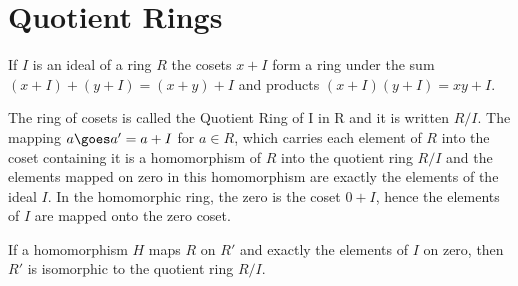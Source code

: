 \section{Quotient Rings }
\begin{theorem}
If $I$ is an ideal of a ring $R$ the cosets $x + I$ form a ring under the sum $ (x + I) + (y + I) = (x+y) + I$ and products
$(x + I ) (y + I) = xy + I$.
\end{theorem}

The ring of cosets is called the {\twelveit Quotient Ring of I in R} and it is written $R/I$.  The mapping $a \goes a' = a + I$ for $a \in R$, which carries each element of $R$ into the coset 
containing it is a homomorphism of $R$ into the quotient ring $R/I$ and the elements mapped on zero in this homomorphism are exactly the elements of the ideal $I$. In the homomorphic ring, the zero is the coset $0 + I$, hence the elements of $I$ are mapped onto the zero coset.  

\begin{theorem}
If a homomorphism $H$ maps $R$ on $R'$ and exactly the elements of $I$ on zero, then $R'$ is isomorphic to the quotient ring $R/I$. 
\end{theorem}